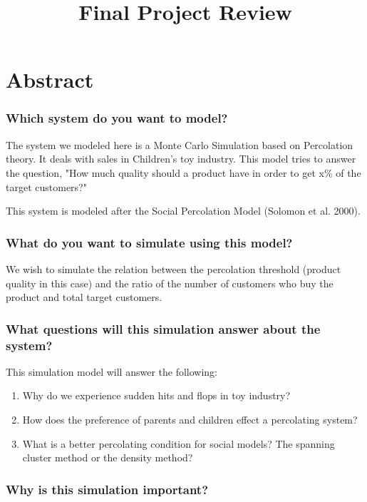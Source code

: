\documentclass[article, 11pt, a4paper, onesize]{memoir}
\title{\vspace{-3em}Final Project Review\vspace{-1em}}
\begin{document}
\maketitle


\chapter{Abstract}

\subsection{Which system do you want to model?}

The system we modeled here is a Monte Carlo Simulation based on Percolation theory. It
deals with sales in Children's toy industry. This model tries to answer the question, "How
much quality should a product have in order to get x\% of the target customers?"

This system is modeled after the Social Percolation Model (Solomon et al. 2000).

\subsection{What do you want to simulate using this model?}

We wish to simulate the relation between the percolation threshold (product quality in
this case) and the ratio of the number of customers who buy the product and total target
customers.

\subsection{What questions will this simulation answer about the system?}

This simulation model will answer the following:

\begin{enumerate}
    \item Why do we experience sudden hits and flops in toy industry?
    \item How does the preference of parents and children effect a percolating system?
    \item What is a better percolating condition for social models? The spanning cluster
        method or the density method?
\end{enumerate}

\subsection{Why is this simulation important?}
\end{document}
